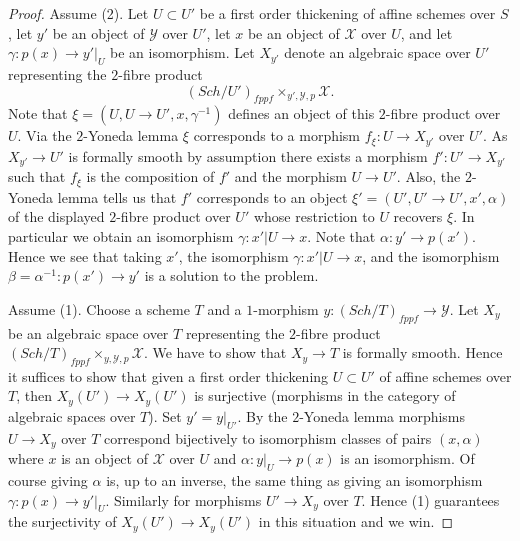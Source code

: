 \documentclass{stacks-project}
\theoremstyle{plain}
\theoremstyle{definition}
\theoremstyle{remark}
\numberwithin{equation}{subsection}
\def\Sch{\mathit{Sch}}
\begin{document}
\begin{proof}
Assume (2). Let $U \subset U'$ be a first order thickening
of affine schemes over $S$, let $y'$ be an object of $\mathcal{Y}$
over $U'$, let $x$ be an object of $\mathcal{X}$ over $U$,
and let $\gamma : p(x) \to y'|_U$ be an isomorphism. Let
$X_{y'}$ denote an algebraic space over $U'$ representing the $2$-fibre
product
$$
(\Sch/U')_{fppf} \times_{y', \mathcal{Y}, p} \mathcal{X}.
$$
Note that $\xi = (U, U \to U', x, \gamma^{-1})$ defines an object of
this $2$-fibre product over $U$. Via the $2$-Yoneda lemma $\xi$ corresponds
to a morphism $f_\xi : U \to X_{y'}$ over $U'$. As $X_{y'} \to U'$ is
formally smooth by assumption there exists a morphism
$f' : U' \to X_{y'}$ such that $f_\xi$ is the composition of $f'$
and the morphism $U \to U'$. Also, the $2$-Yoneda lemma tells us that
$f'$ corresponds to an object $\xi' = (U', U' \to U', x', \alpha)$ of
the displayed $2$-fibre product over $U'$ whose restriction to
$U$ recovers $\xi$. In particular we obtain an isomorphism
$\gamma : x'|U \to x$. Note that $\alpha : y' \to p(x')$.
Hence we see that taking $x'$, the isomorphism
$\gamma : x'|U \to x$, and the isomorphism
$\beta = \alpha^{-1} : p(x') \to y'$
is a solution to the problem.

\medskip\noindent
Assume (1). Choose a scheme $T$ and a $1$-morphism
$y : (\Sch/T)_{fppf} \to \mathcal{Y}$. Let
$X_y$ be an algebraic space over $T$ representing the $2$-fibre product
$(\Sch/T)_{fppf} \times_{y, \mathcal{Y}, p} \mathcal{X}$.
We have to show that $X_y \to T$ is formally smooth.
Hence it suffices to show that given a first order thickening
$U \subset U'$ of affine schemes over $T$, then
$X_y(U') \to X_y(U')$ is surjective (morphisms in the
category of algebraic spaces over $T$). Set $y' = y|_{U'}$.
By the $2$-Yoneda lemma morphisms $U \to X_y$ over $T$ correspond bijectively
to isomorphism classes of pairs $(x, \alpha)$ where $x$ is an object
of $\mathcal{X}$ over $U$ and $\alpha : y|_U \to p(x)$ is an isomorphism.
Of course giving $\alpha$ is, up to an inverse, the same thing as giving
an isomorphism $\gamma : p(x) \to y'|_U$.
Similarly for morphisms $U' \to X_y$ over $T$. Hence (1) guarantees
the surjectivity of $X_y(U') \to X_y(U')$
in this situation and we win.
\end{proof}
\end{document}
